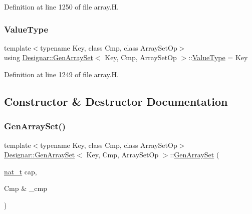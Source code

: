 Definition at line 1250 of file array.\+H.

\mbox{\label{class_designar_1_1_gen_array_set_aef777cbce261e3d5df5f03c632a7c8c2}} 
\subsubsection{\texorpdfstring{Value\+Type}{ValueType}}
{\footnotesize\ttfamily template$<$typename Key, class Cmp, class Array\+Set\+Op$>$ \\
using \hyperlink{class_designar_1_1_gen_array_set}{Designar\+::\+Gen\+Array\+Set}$<$ Key, Cmp, Array\+Set\+Op $>$\+::\hyperlink{class_designar_1_1_gen_array_set_aef777cbce261e3d5df5f03c632a7c8c2}{Value\+Type} =  Key}



Definition at line 1249 of file array.\+H.



\subsection{Constructor \& Destructor Documentation}
\mbox{\label{class_designar_1_1_gen_array_set_a51b519b8c338a8f0e4db3d50e77bfd6f}} 
\subsubsection{\texorpdfstring{Gen\+Array\+Set()}{GenArraySet()}\hspace{0.1cm}{\footnotesize\ttfamily [1/6]}}
{\footnotesize\ttfamily template$<$typename Key, class Cmp, class Array\+Set\+Op$>$ \\
\hyperlink{class_designar_1_1_gen_array_set}{Designar\+::\+Gen\+Array\+Set}$<$ Key, Cmp, Array\+Set\+Op $>$\+::\hyperlink{class_designar_1_1_gen_array_set}{Gen\+Array\+Set} (\begin{DoxyParamCaption}\item[{\hyperlink{namespace_designar_aa72662848b9f4815e7bf31a7cf3e33d1}{nat\+\_\+t}}]{cap,  }\item[{Cmp \&}]{\+\_\+cmp }\end{DoxyParamCaption})\hspace{0.3cm}{\ttfamily [inline]}}



